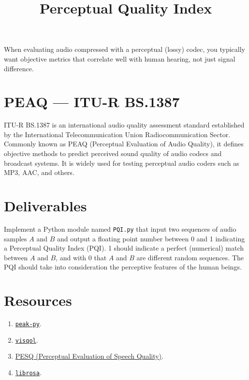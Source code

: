 

\title{Perceptual Quality Index}

\maketitle

When evaluating audio compressed with a perceptual (lossy) codec, you
typically want objective metrics that correlate well with human
hearing, not just signal difference.

\section{PEAQ — ITU-R BS.1387}

ITU-R BS.1387 is an international audio quality assessment standard
established by the International Telecommunication Union
Radiocommunication Sector. Commonly known as PEAQ (Perceptual
Evaluation of Audio Quality), it defines objective methods to predict
perceived sound quality of audio codecs and broadcast systems. It is
widely used for testing perceptual audio coders such as MP3, AAC, and
others.

\section{Deliverables}

Implement a Python module named \verb|PQI.py| that input two sequences
of audio samples $A$ and $B$ and output a floating point number
between 0 and 1 indicating a Perceptual Quality Index (PQI). 1 should
indicate a perfect (numerical) match between $A$ and $B$, and with 0
that $A$ and $B$ are different random sequences. The PQI should take
into consideration the perceptive features of the human beings.

\section{Resources}

\begin{enumerate}
\item \href{https://pypi.org/project/peaq-py/}{\texttt{peak-py}}.
\item \href{https://github.com/google/visqol}{\texttt{visqol}}.
\item \href{https://pypi.org/project/pesq/}{PESQ (Perceptual Evaluation of Speech Quality)}.
\item \href{https://librosa.org/}{\texttt{librosa}}.
\end{enumerate}



